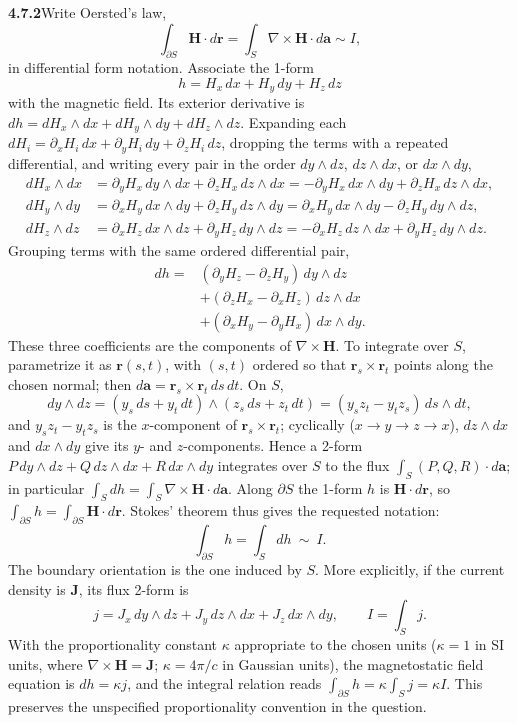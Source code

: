 \par\bigskip
\noindent\textbf{4.7.2}\quad Write Oersted's law,
\[
\int_{\partial S}\mathbf{H}\cdot d\mathbf{r}
=\int_{S}\nabla\times\mathbf{H}\cdot d\mathbf{a}\sim I,
\]
in differential form notation.
\solution
Associate the 1-form
\[
h=H_x\,dx+H_y\,dy+H_z\,dz
\]
with the magnetic field. Its exterior derivative is
$dh=dH_x\wedge dx+dH_y\wedge dy+dH_z\wedge dz$. Expanding each
$dH_i=\partial_xH_i\,dx+\partial_yH_i\,dy+\partial_zH_i\,dz$, dropping
the terms with a repeated differential, and writing every pair in the
order $dy\wedge dz$, $dz\wedge dx$, or $dx\wedge dy$,
\begin{align*}
dH_x\wedge dx&=\partial_yH_x\,dy\wedge dx+\partial_zH_x\,dz\wedge dx
 =-\partial_yH_x\,dx\wedge dy+\partial_zH_x\,dz\wedge dx,\\
dH_y\wedge dy&=\partial_xH_y\,dx\wedge dy+\partial_zH_y\,dz\wedge dy
 =\partial_xH_y\,dx\wedge dy-\partial_zH_y\,dy\wedge dz,\\
dH_z\wedge dz&=\partial_xH_z\,dx\wedge dz+\partial_yH_z\,dy\wedge dz
 =-\partial_xH_z\,dz\wedge dx+\partial_yH_z\,dy\wedge dz.
\end{align*}
Grouping terms with the same ordered differential pair,
\begin{align*}
dh={}&(\partial_yH_z-\partial_zH_y)\,dy\wedge dz\\
&+(\partial_zH_x-\partial_xH_z)\,dz\wedge dx\\
&+(\partial_xH_y-\partial_yH_x)\,dx\wedge dy.
\end{align*}
These three coefficients are the components of $\nabla\times\mathbf H$.
To integrate over $S$, parametrize it as $\mathbf r(s,t)$, with $(s,t)$
ordered so that $\mathbf r_s\times\mathbf r_t$ points along the chosen
normal; then $d\mathbf a=\mathbf r_s\times\mathbf r_t\,ds\,dt$. On $S$,
\[
dy\wedge dz=(y_s\,ds+y_t\,dt)\wedge(z_s\,ds+z_t\,dt)
=(y_sz_t-y_tz_s)\,ds\wedge dt,
\]
and $y_sz_t-y_tz_s$ is the $x$-component of
$\mathbf r_s\times\mathbf r_t$; cyclically ($x\to y\to z\to x$),
$dz\wedge dx$ and $dx\wedge dy$ give its $y$- and $z$-components.
Hence a 2-form $P\,dy\wedge dz+Q\,dz\wedge dx+R\,dx\wedge dy$
integrates over $S$ to the flux $\int_S(P,Q,R)\cdot d\mathbf a$; in
particular $\int_Sdh=\int_S\nabla\times\mathbf H\cdot d\mathbf a$.
Along $\partial S$ the 1-form $h$ is $\mathbf H\cdot d\mathbf r$, so
$\int_{\partial S}h=\int_{\partial S}\mathbf H\cdot d\mathbf r$.
Stokes' theorem thus gives the requested notation:
\[
\boxed{\int_{\partial S}h=\int_Sdh\ \sim\ I}.
\]
The boundary orientation is the one induced by $S$. More explicitly,
if the current density is $\mathbf J$, its flux 2-form is
\[
j=J_x\,dy\wedge dz+J_y\,dz\wedge dx+J_z\,dx\wedge dy,
\qquad I=\int_S j.
\]
With the proportionality constant $\kappa$ appropriate to the chosen
units ($\kappa=1$ in SI units, where $\nabla\times\mathbf H=\mathbf J$;
$\kappa=4\pi/c$ in Gaussian units), the magnetostatic field equation is
$dh=\kappa j$, and the
integral relation reads $\int_{\partial S}h=\kappa\int_Sj=\kappa I$.
This preserves the unspecified proportionality convention in the
question.

